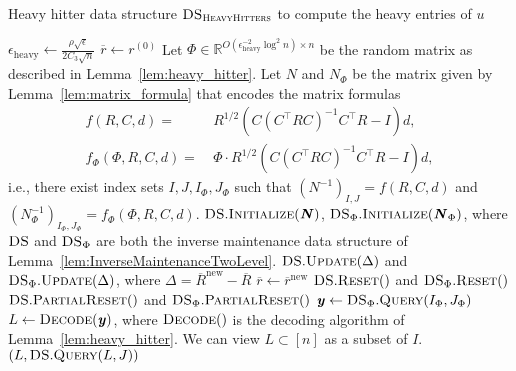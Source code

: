 \documentclass[11pt]{article}
\newcommand{\new}{\mathrm{new}}
\newcommand\dd{\boldsymbol{\mathit{d}}}
\newcommand\rr{\boldsymbol{\mathit{r}}}
\newcommand\uu{\boldsymbol{\mathit{u}}}
\newcommand\yy{\boldsymbol{\mathit{y}}}
\newcommand\CC{\boldsymbol{\mathit{C}}}
\newcommand\II{\boldsymbol{\mathit{I}}}
\newcommand\NN{\boldsymbol{\mathit{N}}}
\newcommand\RR{\boldsymbol{\mathit{R}}}
\newcommand{\ov}{\overline}
\newcommand\R{\mathbb{R}}
\newcommand{\heavy}{\text{heavy}}
\begin{document}
\begin{algorithm}
\caption{Heavy hitter data structure $\textsc{DS}_{\textsc{HeavyHitters}}$ to compute the heavy entries of $\uu$}\label{alg:DS_Heavy_Hitters}
\begin{algorithmic}[1]
\State $\epsilon_{\heavy} \gets \frac{\rho \sqrt{\epsilon}}{2 C_3 \sqrt{n}}$
\State $\ov{\rr} \leftarrow \rr^{(0)}$
\State Let $\Phi \in \R^{O(\epsilon_{\heavy}^{-2} \log^2 n) \times n}$ be the random matrix as described in Lemma~\ref{lem:heavy_hitter}.
\State Let $\NN$ and $\NN_{\Phi}$ be the matrix given by Lemma~\ref{lem:matrix_formula} that encodes the matrix formulas
\begin{align*}
f(\RR, \CC, \dd) = &~ \RR^{1/2} (\CC (\CC^{\top} \RR \CC)^{-1} \CC^{\top} \RR - \II) \dd, \\
f_{\Phi}(\Phi, \RR, \CC, \dd) = &~ \Phi \cdot \RR^{1/2} (\CC (\CC^{\top} \RR \CC)^{-1} \CC^{\top} \RR - \II) \dd,
\end{align*}
i.e., there exist index sets $I,J, I_{\Phi}, J_{\Phi}$ such that $(\NN^{-1})_{I,J} = f(\RR, \CC, \dd)$ and $(\NN_{\Phi}^{-1})_{I_{\Phi},J_{\Phi}} = f_{\Phi}(\Phi, \RR, \CC, \dd)$.
\State $\textsc{DS}.\textsc{Initialize}(\NN)$, $\textsc{DS}_{\Phi}.\textsc{Initialize}(\NN_{\Phi})$, where $\textsc{DS}$ and $\textsc{DS}_{\Phi}$ are both the inverse maintenance data structure of Lemma~\ref{lem:InverseMaintenanceTwoLevel}.
\EndProcedure
\Procedure{UpdateQuery}{$\ov{\rr}^{\new}$}
\State $\textsc{DS}.\textsc{Update}(\Delta)$ and $\textsc{DS}_{\Phi}.\textsc{Update}(\Delta)$, where $\Delta = \ov{\RR}^{\new} - \ov{\RR}$
\State $\ov{\rr} \gets \ov{\rr}^{\new}$
\State $\textsc{DS}.\textsc{Reset}()$ and $\textsc{DS}_{\Phi}.\textsc{Reset}()$
\State $\textsc{DS}.\textsc{PartialReset}()$ and $\textsc{DS}_{\Phi}.\textsc{PartialReset}()$
\EndIf
\State $\yy \gets \textsc{DS}_{\Phi}.\textsc{Query}(I_{\Phi},J_{\Phi})$ \label{algline:DS_heavy_hitters_y}
\State $L \gets \textsc{Decode}(\yy)$, where $\textsc{Decode}()$ is the decoding algorithm of Lemma~\ref{lem:heavy_hitter}. We can view $L \subset [n]$ as a subset of $I$. \label{algline:DS_heavy_hitters_L}
\State \Return $(L, \textsc{DS}.\textsc{Query}(L, J))$ \label{algline:DS_heavy_hitters_return}
\EndProcedure
\end{algorithmic}
\end{algorithm}
\end{document}
